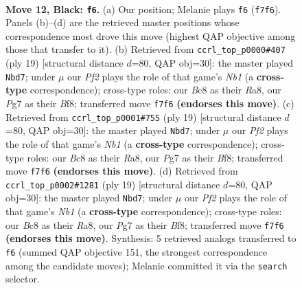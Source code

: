 \documentclass[11pt]{article}
\begin{document}
\clearpage

\begin{figure}[p]\centering
\begin{subfigure}{0.46\textwidth}\centering
\resizebox{\linewidth}{!}{%
\newchessgame
\chessboard[
  setfen={rnb1r2k/p2nqppp/1pp1p3/3pP3/3P4/2N5/PPPQ1PPP/2KR1BNR b - - 1 12},
  showmover=false,
  pgfstyle=straightmove, color=movearrow, markmove={f7-f6}
]}
\caption{}
\end{subfigure}\hfill
\begin{subfigure}{0.46\textwidth}\centering
\resizebox{\linewidth}{!}{%
\newchessgame
\chessboard[
  setfen={rn1qkb1r/1p3pp1/p2p1n2/3Pp2p/8/1N2BP2/PPP3PP/R2QKB1R b KQkq - 0 10},
  showmover=false,
  pgfstyle=straightmove, color=movearrow, markmove={b8-d7}
]}
\caption{}
\end{subfigure}
\\[4pt]
\begin{subfigure}{0.46\textwidth}\centering
\resizebox{\linewidth}{!}{%
\newchessgame
\chessboard[
  setfen={rn1qkb1r/1p3pp1/p2p1n2/3Pp2p/8/1N2BP2/PPP3PP/R2QKB1R b KQkq - 0 10},
  showmover=false,
  pgfstyle=straightmove, color=movearrow, markmove={b8-d7}
]}
\caption{}
\end{subfigure}\hfill
\begin{subfigure}{0.46\textwidth}\centering
\resizebox{\linewidth}{!}{%
\newchessgame
\chessboard[
  setfen={rn1qkb1r/1p3pp1/p2p1n2/3Pp2p/8/1N2BP2/PPP3PP/R2QKB1R b KQkq - 0 10},
  showmover=false,
  pgfstyle=straightmove, color=movearrow, markmove={b8-d7}
]}
\caption{}
\end{subfigure}
\caption{\textbf{Move 12, Black: \texttt{f6}.} (a) Our position; Melanie plays \texttt{f6} (\texttt{f7f6}). Panels (b)--(d) are the retrieved master positions whose correspondence most drove this move (highest QAP objective among those that transfer to it). (b) Retrieved from \texttt{ccrl\_top\_p0000\#407} (ply 19) [structural distance $d$=80, QAP obj=30]: the master played \texttt{Nbd7}; under $\mu$ our \emph{Pf2} plays the role of that game's \emph{Nb1} (a \textbf{cross-type} correspondence); cross-type roles: our \emph{B}c8 as their \emph{R}a8, our \emph{P}g7 as their \emph{B}f8; transferred move \texttt{f7f6} \textbf{(endorses this move)}. (c) Retrieved from \texttt{ccrl\_top\_p0001\#755} (ply 19) [structural distance $d$=80, QAP obj=30]: the master played \texttt{Nbd7}; under $\mu$ our \emph{Pf2} plays the role of that game's \emph{Nb1} (a \textbf{cross-type} correspondence); cross-type roles: our \emph{B}c8 as their \emph{R}a8, our \emph{P}g7 as their \emph{B}f8; transferred move \texttt{f7f6} \textbf{(endorses this move)}. (d) Retrieved from \texttt{ccrl\_top\_p0002\#1281} (ply 19) [structural distance $d$=80, QAP obj=30]: the master played \texttt{Nbd7}; under $\mu$ our \emph{Pf2} plays the role of that game's \emph{Nb1} (a \textbf{cross-type} correspondence); cross-type roles: our \emph{B}c8 as their \emph{R}a8, our \emph{P}g7 as their \emph{B}f8; transferred move \texttt{f7f6} \textbf{(endorses this move)}. Synthesis: 5 retrieved analogs transferred to \texttt{f6} (summed QAP objective 151, the strongest correspondence among the candidate moves); Melanie committed it via the \texttt{search} selector.}
\label{fig:thought-m23}
\end{figure}
\end{document}
